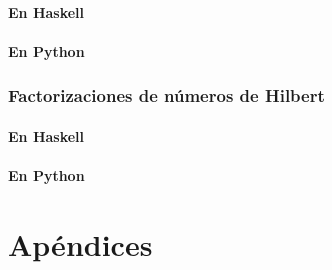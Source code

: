 \documentclass[a4paper,12pt,twoside]{book}
\begin{document}
\subsection{En Haskell}
\subsection{En Python}

\section{Factorizaciones de números de Hilbert}
\subsection{En Haskell}
\subsection{En Python}

\part*{Apéndices}
\appendix

% 




\nocite{Allen-16a}
\nocite{Alonso-12a}
\nocite{Alonso-19a}
\nocite{Alonso-21a}
\nocite{Alonso-22a}
\nocite{Bird-10}
\nocite{Bird-14a}
\nocite{Bird-99a}
\nocite{Bird-Gibbons-20a}
\nocite{Casamayou-12a}
\nocite{Downey-02a}
\nocite{Goodrich-13data}
\nocite{Guttag-16introduction}
\nocite{Hall-10a}
\nocite{Hetland-11apython}
\nocite{Hudak-12a}
\nocite{Hunt-19a}
\nocite{Hunt-19b}
\nocite{Hutton-16a}
\nocite{Kurt-18a}
\nocite{Lipovača}
\nocite{Lott-18a}
\nocite{OSullivan-08a}
\nocite{Okasaki-19a}
\nocite{Padmanabhan-17a}
\nocite{Polya-65a}
\nocite{Rabhi-99a}
\nocite{Rubio-17a}
\nocite{Ruiz-04}
\nocite{Saha-15a}
\nocite{Sajanikar-17a}
\nocite{Sannella-22a}
\nocite{Serrano-14a}
\nocite{Shukla-14a}
\nocite{Stephenson-15a}
\nocite{Thompson-11a}
\nocite{vanHattem-22a}



\end{document}
